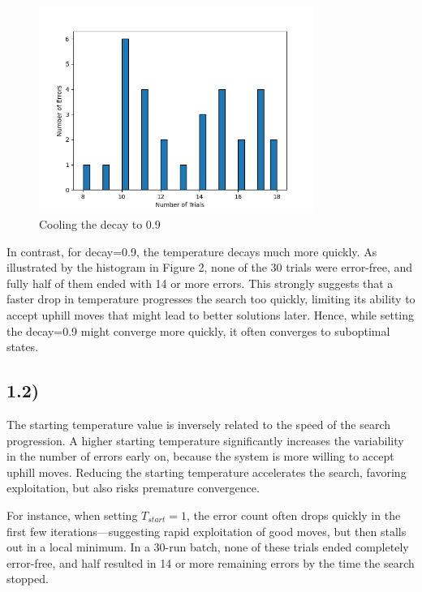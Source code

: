 \documentclass[11pt]{article}
\begin{document}
\begin{figure}[H]
\centering
\includegraphics[width=0.8\textwidth]{images/Figure_11.png}
\caption{Cooling the decay to 0.9}
\label{fig:cooling}
\end{figure}
In contrast, for decay=0.9, the temperature decays much more quickly.
As illustrated by the histogram in Figure 2, none of the 30 trials were error-free, and fully half of them ended with 14 or more errors.
This strongly suggests that a faster drop in temperature progresses the search too quickly,
limiting its ability to accept uphill moves that might lead to better solutions later. Hence, while setting the decay=0.9 might converge more quickly,
it often converges to suboptimal states.
\newpage

\subsection*{1.2)}
The starting temperature value is inversely related to the speed of the search progression. A higher starting temperature significantly increases the variability in the number of errors early on, because the system is more willing to accept uphill moves.
Reducing the starting temperature accelerates the search, favoring exploitation, but also risks premature convergence.

For instance, when setting $T_{start} = 1$, the error count often drops quickly in the first few iterations—suggesting rapid exploitation of good moves, but then stalls out in a local minimum.
In a 30-run batch, none of these trials ended completely error-free, and half resulted in 14 or more remaining errors by the time the search stopped.
\end{document}
